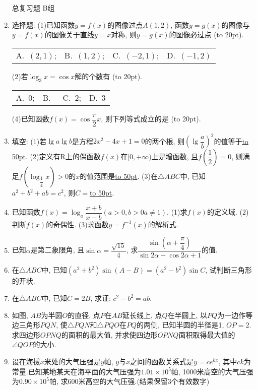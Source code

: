 \documentclass[10pt,a4paper]{article}
\newcommand{\blank}[1]{\underline{\hbox to #1pt{}}}
\newcommand{\bracket}[1]{(\hbox to #1pt{})}
\newcommand{\fourch}[4]{\par\begin{tabular}{p{.23\textwidth}p{.23\textwidth}p{.23\textwidth}p{.23\textwidth}}
A.~#1 &B.~#2& C.~#3& D.~#4
\end{tabular}}
\begin{document}
\begin{enumerate}[1.]
总复习题
B组
\item 选择题:
(1)已知函数$y=f(x)$的图像过点$A(1,2)$, 函数$y=g(x)$的图像与$y=f(x)$的图像关于直线$y=x$对称, 则$y=g(x)$的图像必过点						\bracket{20}.
\fourch{$(2,1)$;}{$(1,2)$;}{$(-2,1)$;}{$(-1,2)$}
(2)若$\log _3x=\cos x$解的个数有											\bracket{20}.
\fourch{0;}{}{2;}{3}
(4)已知函数$f(x)=\cos \dfrac{\pi }2x$, 则下列等式成立的是						\bracket{20}.
\item 填空:
(1)若$\lg a\lg b$是方程$2x^2-4x+1=0$的两个根, 则$(\lg \dfrac ab)^2$的值等于\blank{50}.
(2)定义有R上的偶函数$f(x)$在$[0,+\infty)$上是增函数, 且$f(\dfrac 12)=0$, 则满足$f(\log _{\dfrac 14}x)>0$的$x$的值范围是\blank{50}.
(3)在$\triangle ABC$中, 已知$a^2+b^2+ab=c^2$, 则$C=$\blank{50}.
\item 已知函数$f(x)=\log _a\dfrac{x+b}{x-b}(a>0,b>0a\ne 1)$.
(1)求$f(x)$的定义域.
(2)判断$f(x)$的奇偶性.
(3)求函数$y=f^{-1}(x)$的解析式.
\item 已知$\alpha$是第二象限角, 且$\sin \alpha =\dfrac{\sqrt {15}}4$, 求$\dfrac{\sin (\alpha +\dfrac{\pi }4)}{\sin 2\alpha +\cos 2\alpha +1}$的值.
\item 在$\triangle ABC$中, 已知$(a^2+b^2)\sin (A-B)=(a^2-b^2)\sin C$, 试判断三角形的开状.
\item 在$\triangle ABC$中, 已知$C=2B$, 求证: $c^2-b^2=ab$.
\item 如图, $AB$为半圆$O$的直径, 点$P$在$AB$延长线上, 点$Q$在半圆上, 以$PQ$为一边作等边三角形$PQN$, 使$\triangle PQN$和$\triangle PQO$在$PQ$的两侧, 已知半圆的半径是1, $OP=2$.求四边形$OPNQ$的面积的最大值, 并求使四边形$OPNQ$面积取得最大值的$\angle QOP$的大小.
\item 设在海拔$x$米处的大气压强是$y$帕, $y$与$x$之间的函数关系式是$y=ce^{kx}$, 其中$ck$为常量.已知某地某天在海平面的大气压强为$1.01\times 10^5$帕, 1000米高空的大气压强为$0.90\times 10^5$帕, 求600米高空的大气压强.(结果保留3个有效数字)


\end{enumerate}
\end{document}
